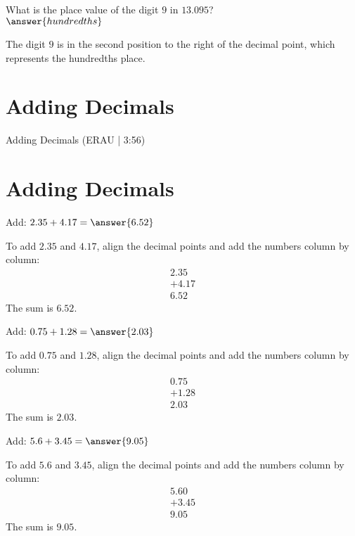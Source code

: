 \documentclass{ximera}
\begin{document}
\begin{problem}
What is the place value of the digit $9$ in $13.095$?\\
$\answer{hundredths}$
\begin{feedback}
The digit $9$ is in the second position to the right of the decimal point, which represents the hundredths place.
\end{feedback}
\end{problem}

\section*{Adding Decimals}

Adding Decimals (ERAU | 3:56)



\section*{Adding Decimals}

\begin{problem}
Add: $2.35 + 4.17 = \answer{6.52}$
\begin{feedback}
To add $2.35$ and $4.17$, align the decimal points and add the numbers column by column:
\begin{align*}
  2.35 \\
+ 4.17 \\
\hline
  6.52
\end{align*}
The sum is $6.52$.
\end{feedback}
\end{problem}

\begin{problem}
Add: $0.75 + 1.28 = \answer{2.03}$
\begin{feedback}
To add $0.75$ and $1.28$, align the decimal points and add the numbers column by column:
\begin{align*}
  0.75 \\
+ 1.28 \\
\hline
  2.03
\end{align*}
The sum is $2.03$.
\end{feedback}
\end{problem}

\begin{problem}
Add: $5.6 + 3.45 = \answer{9.05}$
\begin{feedback}
To add $5.6$ and $3.45$, align the decimal points and add the numbers column by column:
\begin{align*}
  5.60 \\
+ 3.45 \\
\hline
  9.05
\end{align*}
The sum is $9.05$.
\end{feedback}
\end{problem}
\end{document}
